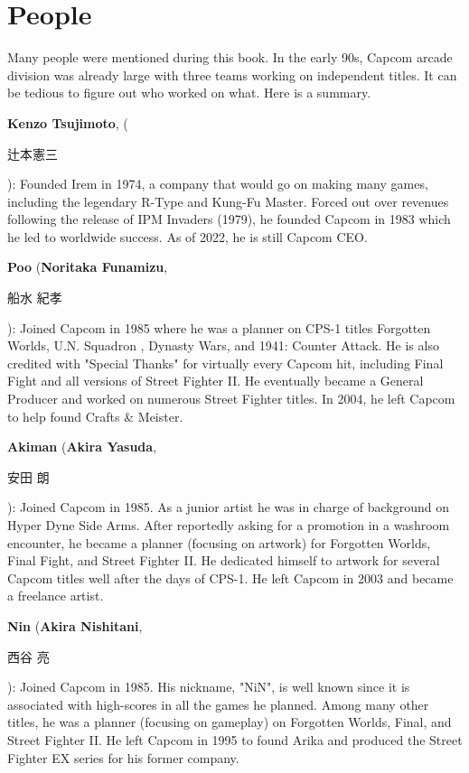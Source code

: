 \chapter{People} 
\label{people}

Many people were mentioned during this book. In the early 90s, Capcom arcade division was already large with three teams working on independent titles. It can be tedious to figure out who worked on what. Here is a summary.

\textbf{Kenzo Tsujimoto}, (\begin{CJK}{UTF8}{min}辻本憲三\end{CJK}): Founded Irem in 1974, a company that would go on making many games, including the legendary R-Type and Kung-Fu Master. Forced out over revenues following the release of IPM Invaders (1979), he founded Capcom in 1983 which he led to worldwide success. As of 2022, he is still Capcom CEO. 

\textbf{Poo} (\textbf{Noritaka Funamizu}, \begin{CJK}{UTF8}{min}船水 紀孝\end{CJK}): Joined Capcom in 1985 where he was a planner on CPS-1 titles Forgotten Worlds, U.N. Squadron , Dynasty Wars, and 1941: Counter Attack. He is also credited with "Special Thanks" for virtually every Capcom hit, including Final Fight and all versions of Street Fighter II. He eventually became a General Producer and worked on numerous Street Fighter titles. In 2004, he left Capcom to help found Crafts \& Meister.

\textbf{Akiman} (\textbf{Akira Yasuda}, \begin{CJK}{UTF8}{min}安田 朗\end{CJK}): Joined Capcom in 1985. As a junior artist he was in charge of background on Hyper Dyne Side Arms. After reportedly asking for a promotion in a washroom encounter, he became a planner (focusing on artwork) for Forgotten Worlds, Final Fight, and Street Fighter II. He dedicated himself to artwork for several Capcom titles well after the days of CPS-1. He left Capcom in 2003 and became a freelance artist.

\textbf{Nin} (\textbf{Akira Nishitani}, \begin{CJK}{UTF8}{min}西谷 亮\end{CJK}): Joined Capcom in 1985. His nickname, "NiN", is well known since it is associated with high-scores in all the games he planned. Among many other titles, he was a planner (focusing on gameplay) on Forgotten Worlds, Final, and Street Fighter II. He left Capcom in 1995 to found Arika and produced the Street Fighter EX series for his former company.

